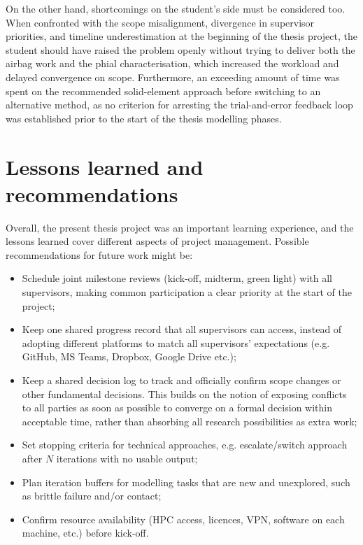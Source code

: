 On the other hand, shortcomings on the student's side must be considered too. When confronted with the scope misalignment, divergence in supervisor priorities, and timeline underestimation at the beginning of the thesis project, the student should have raised the problem openly without trying to deliver both the airbag work and the phial characterisation, which increased the workload and delayed convergence on scope. Furthermore, an exceeding amount of time was spent on the recommended solid-element approach before switching to an alternative method, as no criterion for arresting the trial-and-error feedback loop was established prior to the start of the thesis modelling phases. 


\section{Lessons learned and recommendations}
\label{sec:pm-lessons}
Overall, the present thesis project was an important learning experience, and the lessons learned cover different aspects of project management. Possible recommendations for future work might be:

\begin{itemize}
    \item Schedule joint milestone reviews (kick-off, midterm, green light) with all supervisors, making common participation a clear priority at the start of the project;
    \item Keep one shared progress record that all supervisors can access, instead of adopting different platforms to match all supervisors' expectations (e.g. GitHub, MS Teams, Dropbox, Google Drive etc.);
    \item Keep a shared decision log to track and officially confirm scope changes or other fundamental decisions. This builds on the notion of exposing conflicts to all parties as soon as possible to converge on a formal decision within acceptable time, rather than absorbing all research possibilities as extra work;
    \item Set stopping criteria for technical approaches, e.g. escalate/switch approach after $N$ iterations with no usable output;
    \item Plan iteration buffers for modelling tasks that are new and unexplored, such as brittle failure and/or contact;
    \item Confirm resource availability (HPC access, licences, VPN, software on each machine, etc.) before kick-off.
\end{itemize}